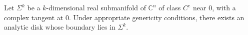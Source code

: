 
Let $\Sigma^k$ be a $k$-dimensional real submanifold of $\mathbb{C}^n$ of class $C^e$ near $0$, with a complex tangent at $0$. Under appropriate genericity conditions, there exists an analytic disk whose boundary lies in $\Sigma^k$.
